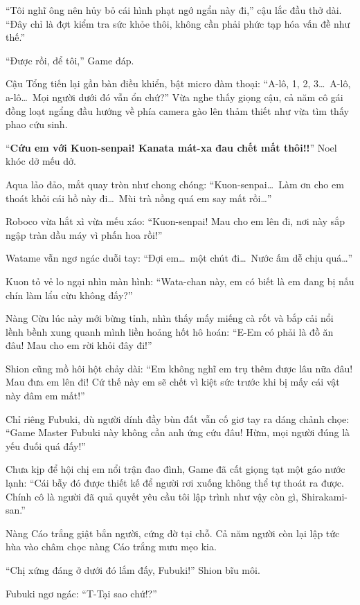 \documentclass[../main.tex]{subfiles}
\begin{document}
``Tôi nghĩ ông nên hủy bỏ cái hình phạt ngớ ngẩn này đi,'' cậu lắc đầu thở dài. ``Đây chỉ là đợt kiểm tra sức khỏe thôi, không cần phải phức tạp hóa vấn đề như thế.''

``Được rồi, để tôi,'' Game đáp.

Cậu Tổng tiến lại gần bàn điều khiển, bật micro đàm thoại: ``A-lô, 1, 2, 3\dots\ A-lô, a-lô\dots\ Mọi người dưới đó vẫn ổn chứ?'' Vừa nghe thấy giọng cậu, cả năm cô gái đồng loạt ngẩng đầu hướng về phía camera gào lên thảm thiết như vừa tìm thấy phao cứu sinh.

``\textbf{Cứu em với Kuon-senpai! Kanata mát-xa đau chết mất thôi!!}'' Noel khóc dở mếu dở.

Aqua lảo đảo, mắt quay tròn như chong chóng: ``Kuon-senpai\dots\ Làm ơn cho em thoát khỏi cái hồ này đi\dots\ Mùi trà nồng quá em say mất rồi\dots''

Roboco vừa hắt xì vừa mếu xáo: ``Kuon-senpai! Mau cho em lên đi, nơi này sắp ngập tràn dầu máy vì phấn hoa rồi!''

Watame vẫn ngơ ngác duỗi tay: ``Đợi em\dots\ một chút đi\dots\ Nước ấm dễ chịu quá\dots''

Kuon tỏ vẻ lo ngại nhìn màn hình: ``Wata-chan này, em có biết là em đang bị nấu chín làm lẩu cừu không đấy?''

Nàng Cừu lúc này mới bừng tỉnh, nhìn thấy mấy miếng cà rốt và bắp cải nổi lềnh bềnh xung quanh mình liền hoảng hốt hô hoán: ``E-Em có phải là đồ ăn đâu! Mau cho em rời khỏi đây đi!''

Shion cũng mồ hôi hột chảy dài: ``Em không nghĩ em trụ thêm được lâu nữa đâu! Mau đưa em lên đi! Cứ thế này em sẽ chết vì kiệt sức trước khi bị mấy cái vật này đâm em mất!''

Chỉ riêng Fubuki, dù người dính đầy bùn đất vẫn cố giơ tay ra dáng chảnh chọe: ``Game Master Fubuki này không cần anh ứng cứu đâu! Hừm, mọi người đúng là yếu đuối quá đấy!''

Chưa kịp để hội chị em nổi trận đao đình, Game đã cất giọng tạt một gáo nước lạnh: ``Cái bẫy đó được thiết kế để người rơi xuống không thể tự thoát ra được. Chính cô là người đã quả quyết yêu cầu tôi lập trình như vậy còn gì, Shirakami-san.''

Nàng Cáo trắng giật bắn người, cứng đờ tại chỗ. Cả năm người còn lại lập tức hùa vào châm chọc nàng Cáo trắng mưu mẹo kia.

``Chị xứng đáng ở dưới đó lắm đấy, Fubuki!'' Shion bĩu môi.

Fubuki ngơ ngác: ``T-Tại sao chứ!?''
\end{document}
